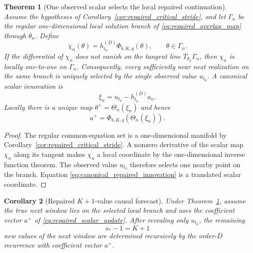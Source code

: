 \documentclass[11pt]{amsart}
\numberwithin{equation}{section}
\theoremstyle{plain}
\newtheorem{theorem}{Theorem}[section]
\newtheorem{corollary}[theorem]{Corollary}
\theoremstyle{definition}
\theoremstyle{remark}
\begin{document}
\begin{theorem}[One observed scalar selects the local repaired continuation]
\label{thm:repaired_one_sample}
Assume the hypotheses of Corollary~\ref{cor:repaired_critical_stride}, and let $\Gamma_n$ be the regular one-dimensional local solution branch of \eqref{eq:repaired_overlap_map} through $\theta_n$. Define
\begin{equation}\chi_n(\theta)=h^{(D)}_{t_0}\Phi_{b,K,q}(\theta),\qquad \theta\in\Gamma_n.\label{eq:repaired_observation_map}\end{equation}
If the differential of $\chi_n$ does not vanish on the tangent line $T_{\theta_n}\Gamma_n$, then $\chi_n$ is locally one-to-one on $\Gamma_n$. Consequently, every sufficiently near next realization on the same branch is uniquely selected by the single observed value $u_{t_0}$.
A canonical scalar innovation is
\begin{equation}
\boxed{\xi_n=u_{t_0}-h^{(D)}_{t_0}a_n.}
\label{eq:canonical_repaired_innovation}
\end{equation}
Locally there is a unique map $\theta^+=\Theta_n(\xi_n)$ and hence
\begin{equation}
a^+=\Phi_{b,K,q}\!\left(\Theta_n(\xi_n)\right).
\label{eq:repaired_scalar_update}
\end{equation}
\end{theorem}

\begin{proof}
The regular common-equation set is a one-dimensional manifold by Corollary~\ref{cor:repaired_critical_stride}. A nonzero derivative of the scalar map $\chi_n$ along its tangent makes $\chi_n$ a local coordinate by the one-dimensional inverse function theorem. The observed value $u_{t_0}$ therefore selects one nearby point on the branch. Equation \eqref{eq:canonical_repaired_innovation} is a translated scalar coordinate.
\end{proof}

\begin{corollary}[Repaired $K+1$-value causal forecast]
\label{cor:repaired_forecast}
Under Theorem~\ref{thm:repaired_one_sample}, assume the true next window lies on the selected local branch and uses the coefficient vector $a^+$ of \eqref{eq:repaired_scalar_update}. After revealing only $u_{t_0}$, the remaining
\begin{equation}s_*-1=K+1\label{eq:repaired_remaining_count}\end{equation}
new values of the next window are determined recursively by the order-$D$ recurrence with coefficient vector $a^+$.
\end{corollary}
\end{document}
